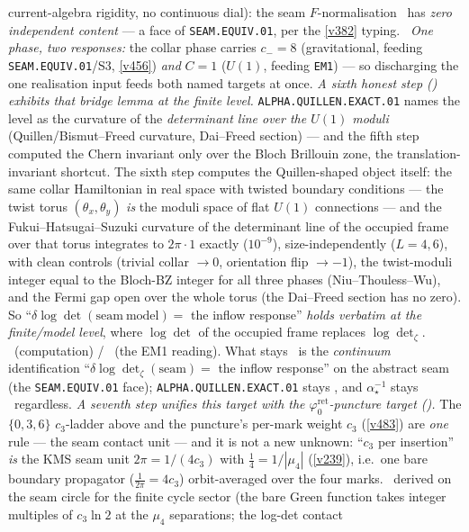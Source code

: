 \documentclass[11pt,a4paper]{article}
\newcommand{\cthree}{c_3}
\newcommand{\phiz}{\varphi_0^{\mathrm{ret}}}
\newcommand{\ainv}{\alpha^{-1}_\star}
\theoremstyle{definition}
\begin{document}
current-algebra rigidity, no continuous dial): the seam $F$-normalisation \mC\ has \emph{zero independent
content} --- a face of \texttt{SEAM.EQUIV.01}, per the \vref{v382} typing. \mC\ \emph{One phase, two
responses:} the collar phase carries $c_-=8$ (gravitational, feeding \texttt{SEAM.EQUIV.01}/S3, \vref{v456})
\emph{and} $C=1$ ($U(1)$, feeding \texttt{EM1}) --- so discharging the one realisation input feeds both named
targets at once.
\emph{A sixth honest step () exhibits that bridge lemma at the finite
level.} \texttt{ALPHA.QUILLEN.EXACT.01} names the level as the curvature of the \emph{determinant line over
the $U(1)$ moduli} (Quillen/Bismut--Freed curvature, Dai--Freed section) --- and the fifth step computed the
Chern invariant only over the Bloch Brillouin zone, the translation-invariant shortcut. The sixth step
computes the Quillen-shaped object itself: the same collar Hamiltonian in real space with twisted boundary
conditions --- the twist torus $(\theta_x,\theta_y)$ \emph{is} the moduli space of flat $U(1)$ connections
--- and the Fukui--Hatsugai--Suzuki curvature of the determinant line of the occupied frame over that torus
integrates to $2\pi\cdot 1$ exactly ($10^{-9}$), size-independently ($L=4,6$), with clean controls (trivial
collar $\to 0$, orientation flip $\to -1$), the twist-moduli integer equal to the Bloch-BZ integer for all
three phases (Niu--Thouless--Wu), and the Fermi gap open over the whole torus (the Dai--Freed section has no
zero). So ``$\delta\log\det(\mathrm{seam~model})=$ the inflow response'' \emph{holds verbatim at the
finite/model level}, where $\log\det$ of the occupied frame replaces $\log\det_\zeta$. \mE\ (computation) /
\mC\ (the EM1 reading). What stays \mO\ is the \emph{continuum} identification
``$\delta\log\det_\zeta(\mathrm{seam})=$ the inflow response'' on the abstract seam (the
\texttt{SEAM.EQUIV.01} face); \texttt{ALPHA.QUILLEN.EXACT.01} stays \mO, and $\ainv$ stays \mE\ regardless.
\emph{A seventh step unifies this target with the $\phiz$-puncture target
().} The $\{0,3,6\}$ $\cthree$-ladder above and the puncture's per-mark
weight $\cthree$ (\vref{v483}) are \emph{one} rule --- the seam contact unit --- and it is not a new
unknown: ``$\cthree$ per insertion'' \emph{is} the KMS seam unit $2\pi=1/(4\cthree)$ with
$\tfrac14=1/|\mu_4|$ (\vref{v239}), i.e.\ one bare boundary propagator ($\tfrac1{2\pi}=4\cthree$)
orbit-averaged over the four marks. \mE\ derived on the seam circle for the finite cycle sector (the bare
Green function takes integer multiples of $\cthree\ln2$ at the $\mu_4$ separations; the log-det contact
\end{document}
